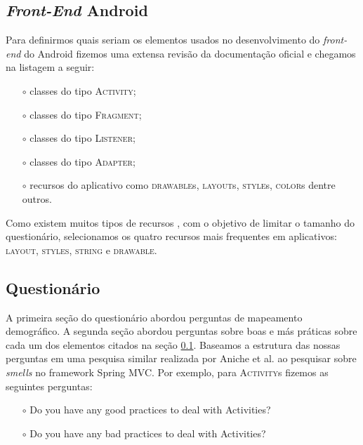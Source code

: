 \subsection{\textit{Front-End} Android}
\label{sub:front-end-android}

Para definirmos quais seriam os elementos usados no desenvolvimento do \textit{front-end} do Android fizemos uma extensa revis\~ao da documenta\c{c}\~ao oficial \cite{AndroidDeveloperSite2016} e chegamos na listagem a seguir:

\begin{itemize} 
	\item[$\circ$] classes do tipo \textsc{Activity};
	\item[$\circ$] classes do tipo \textsc{Fragment};
	\item[$\circ$] classes do tipo \textsc{Listener};
	\item[$\circ$] classes do tipo \textsc{Adapter};
	\item[$\circ$] recursos do aplicativo como \textsc{drawable}s, \textsc{layout}s, \textsc{style}s, \textsc{color}s dentre outros.
\end{itemize}

Como existem muitos tipos de recursos \cite{AndroidResourcesOverview}, com o objetivo de limitar o tamanho do question\'ario, selecionamos os quatro recursos mais frequentes em aplicativos: \textsc{layout}, \textsc{styles}, \textsc{string} e \textsc{drawable}.


\subsection{Question\'ario}
\label{sub:questionario}

A primeira se\c{c}\~ao do question\'ario abordou perguntas de mapeamento demogr\'afico. A segunda se\c{c}\~ao abordou perguntas sobre boas e m\'as pr\'aticas sobre cada um dos elementos citados na se\c{c}\~ao \ref{sub:front-end-android}. Baseamos a estrutura das nossas perguntas em uma pesquisa similar realizada por Aniche et al. \cite{MvcSmells:16} ao pesquisar sobre \textit{smells} no framework Spring MVC. Por exemplo, para \textsc{Activity}s fizemos as seguintes perguntas: 

\begin{itemize} 
	\item[$\circ$] Do you have any good practices to deal with Activities?
	\item[$\circ$] Do you have any bad practices to deal with Activities? 
\end{itemize}

